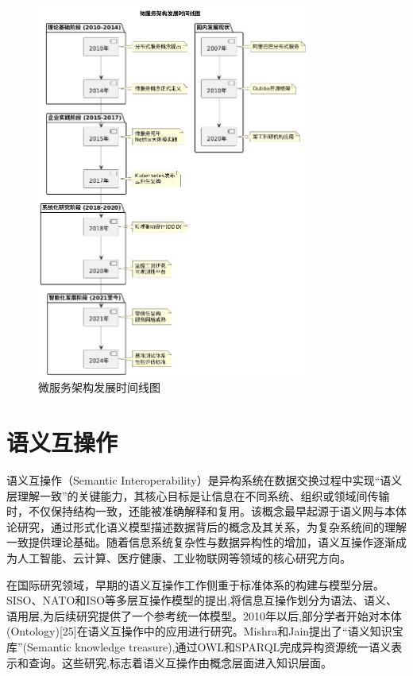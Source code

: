 \begin{figure}[H]
    \centering
    \includegraphics[width=0.8\textwidth,height=0.6\textheight,keepaspectratio]{chapters/fig-0/microservices_evolution_timeline.png}
    \caption{微服务架构发展时间线图}
    \label{fig_microservices_evolution_timeline}
\end{figure}


\section{语义互操作}

语义互操作（Semantic Interoperability）是异构系统在数据交换过程中实现“语义层理解一致”的关键能力，其核心目标是让信息在不同系统、组织或领域间传输时，不仅保持结构一致，还能被准确解释和复用。该概念最早起源于语义网与本体论研究，通过形式化语义模型描述数据背后的概念及其关系，为复杂系统间的理解一致提供理论基础。随着信息系统复杂性与数据异构性的增加，语义互操作逐渐成为人工智能、云计算、医疗健康、工业物联网等领域的核心研究方向。

在国际研究领域，早期的语义互操作工作侧重于标准体系的构建与模型分层。SISO、NATO和ISO等多层互操作模型的提出,将信息互操作划分为语法、语义、语用层\cite{SISO_STD_002_2006,CJCSI_6610_01F_2021},为后续研究提供了一个参考统一体模型。2010年以后,部分学者开始对本体(Ontology)[25]在语义互操作中的应用进行研究。Mishra和Jain提出了“语义知识宝库”(Semantic knowledge treasure),通过OWL和SPARQL完成异构资源统一语义表示和查询\cite{Mishra2018Semantic}。这些研究,标志着语义互操作由概念层面进入知识层面。


